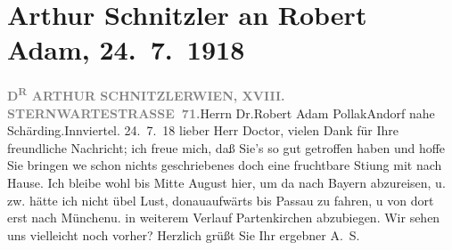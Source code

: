 

         
         \renewcommand{\erwaehntePersonen}{Personen: Robert Adam}
         \renewcommand{\erwaehnteOrte}{Orte: Andorf, Bayern, Innviertel, München, Partenkirchen, Passau, Sternwartestraße, Wien}
         \renewcommand{\erwaehnteWerke}{}
               \section[Arthur Schnitzler an Robert Adam, 24. 7. 1918]{ Arthur Schnitzler an Robert Adam, 24. 7. 1918}\nopagebreak{}\rehead{ }\begin{ledgroupsized}[t]{13cm}\normalsize\beginnumbering \toendnotes[C]{\smallbreak\pagebreak[2]} 
\pstart{}{\pb}\textcolor{gray}{\textbf{D\textsuperscript{R} ARTHUR SCHNITZLER}}\pend{}\pstart{}\textcolor{gray}{\textbf{WIEN, XVIII. STERNWARTESTRASSE 71.}}\pend{}{\bigskip}\pstart{}Herrn Dr.\pend{}\pstart{}Robert Adam Pollak\pend{}\pstart{}Andorf nahe Schärding.\pend{}\pstart{}Innviertel.\pend{}{\bigskip}\pstart
           \raggedleft{}{\pb}24. 7. 18\pend
           \pstart
           lieber Herr Doctor,  vielen Dank für Ihre freundliche Nachricht; ich
               freue mich, daß Sie’s so gut getroffen haben und hoffe Sie bringen we{\geminationn} schon nichts geschriebenes doch eine fruchtbare Sti{\geminationm}ung mit nach Hause. Ich bleibe wohl bis Mitte
                  August hier, um da{\geminationn} nach Bayern abzureisen, u. zw. hätte ich nicht übel Lust, donauaufwärts bis Passau zu fahren, u von dort erst nach Münchenu. in weiterem Verlauf Partenkirchen abzubiegen. Wir sehen uns vielleicht noch vorher? Herzlich
               grüßt Sie Ihr ergebner\pend
           \pstart \spacefill\mbox{A. S.}\pend{}
         
         \endnumbering{}\end{ledgroupsized}  \newcommand{\dateiname}{L02290}\newcommand{\titel}{Arthur Schnitzler an Robert Adam, 24. 7. 1918}\newcommand{\editorInnen}{Martin Anton Müller und Gerd-Hermann Susen}
      